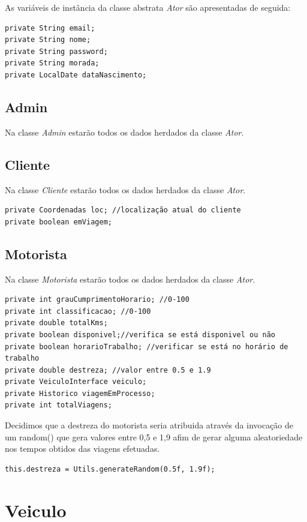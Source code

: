 As variáveis de instância da classe abstrata \textit{Ator} são apresentadas de seguida: 
\begin{verbatim}
private String email; 
private String nome; 
private String password; 
private String morada; 
private LocalDate dataNascimento; 
\end{verbatim}


\subsection{Admin}

Na classe \textit{Admin} estarão todos os dados herdados da classe \textit{Ator}. 


\subsection{Cliente}
Na classe \textit{Cliente} estarão todos os dados herdados da classe \textit{Ator}. 

\begin{verbatim}
private Coordenadas loc; //localização atual do cliente
private boolean emViagem;
\end{verbatim}
\subsection{Motorista}
Na classe \textit{Motorista} estarão todos os dados herdados da classe \textit{Ator}. 

\begin{verbatim}
private int grauCumprimentoHorario; //0-100
private int classificacao; //0-100
private double totalKms; 
private boolean disponivel;//verifica se está disponivel ou não 
private boolean horarioTrabalho; //verificar se está no horário de trabalho
private double destreza; //valor entre 0.5 e 1.9
private VeiculoInterface veiculo; 
private Historico viagemEmProcesso;
private int totalViagens;
\end{verbatim}

Decidimos que a destreza do motorista seria atribuida através da invocação de um random() que gera valores entre 0,5  e 1,9 afim de gerar alguma aleatoriedade nos tempos obtidos das viagens efetuadas. 
\begin{verbatim}
this.destreza = Utils.generateRandom(0.5f, 1.9f); 
\end{verbatim}

\newpage
\section{Veiculo}

